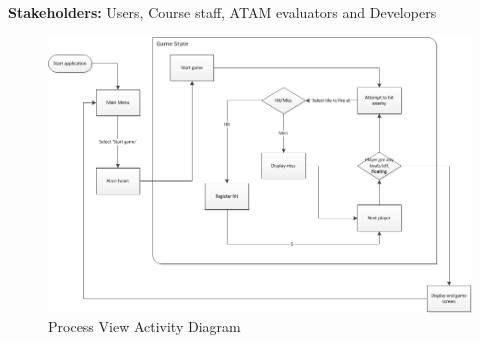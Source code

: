     \noindent\textbf{Stakeholders:} Users, Course staff, ATAM evaluators and Developers 
    
    \begin{figure}[ht]
        \includegraphics[angle=90, scale=0.8]{ProcessLayer.png}
        \caption{Process View Activity Diagram}
        \label{fig:ActivityDiagram}
    \end{figure}